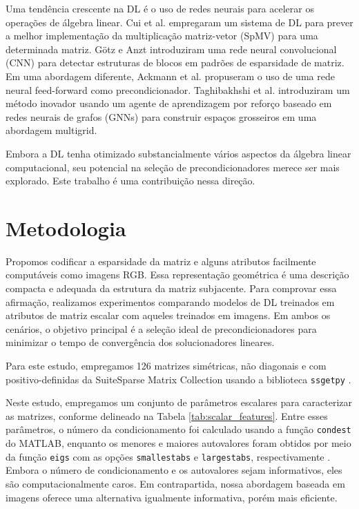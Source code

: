 \documentclass{pssbmac}
\begin{document}
Uma tendência crescente na DL é o uso de redes neurais para acelerar os 
operações de álgebra linear. Cui et al. \cite{cui2016code} empregaram um sistema de 
DL para prever a melhor implementação da multiplicação matriz-vetor (SpMV) para uma 
determinada matriz. G{\"o}tz e Anzt \cite{gotz2018machine} introduziram 
uma rede neural convolucional (CNN) para detectar estruturas de blocos em 
padrões de esparsidade de matriz. Em uma abordagem diferente, 
Ackmann et al. \cite{ackmann2020machine} propuseram o uso de uma 
rede neural feed-forward como precondicionador. Taghibakhshi et al. 
\cite{taghibakhshi2021optimization} introduziram um método inovador usando 
um agente de aprendizagem por reforço baseado em redes neurais de grafos (GNNs) 
para construir espaços grosseiros em uma abordagem multigrid. 

Embora a DL tenha otimizado substancialmente vários aspectos da álgebra linear computacional,
seu potencial na seleção de precondicionadores merece ser mais explorado. 
Este trabalho é uma contribuição nessa direção.

\section{Metodologia}\label{sec:method}

Propomos codificar a esparsidade da matriz e alguns atributos facilmente 
computáveis como imagens RGB. Essa representação geométrica é uma descrição compacta 
e adequada da estrutura da matriz subjacente. Para comprovar essa afirmação, 
realizamos experimentos comparando modelos de DL treinados em atributos de 
matriz escalar com aqueles treinados em imagens. Em ambos os cenários, o 
objetivo principal é a seleção ideal de precondicionadores para minimizar o tempo de 
convergência dos solucionadores lineares.

Para este estudo, empregamos 126 matrizes simétricas, 
não diagonais e com  positivo-definidas da SuiteSparse Matrix Collection usando a
 biblioteca \texttt{ssgetpy} \cite{kolodziej2019suitesparse,ssgetpy}. 

Neste estudo, empregamos um conjunto de parâmetros escalares para caracterizar 
as matrizes, conforme delineado na Tabela \ref{tab:scalar_features}.
 Entre esses parâmetros, o número da condicionamento foi calculado usando a 
 função \texttt{condest} do MATLAB, enquanto os menores e maiores autovalores 
foram obtidos por meio da função \texttt{eigs} com as opções \texttt{smallestabs} e 
\texttt{largestabs}, respectivamente \cite{matlab}. 
Embora o número de condicionamento e os autovalores sejam informativos, 
eles são computacionalmente caros. Em contrapartida, 
nossa abordagem baseada em imagens oferece uma alternativa igualmente informativa, porém mais eficiente.
\end{document}
